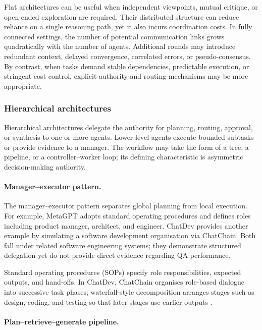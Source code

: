 \documentclass[a4paper,fleqn]{cas-dc}
\begin{document}
Flat architectures can be useful when independent viewpoints, mutual critique, or open-ended exploration are required. Their distributed structure can reduce reliance on a single reasoning path, yet it also incurs coordination costs.
In fully connected settings, the number of potential communication links grows quadratically with the number of agents. Additional rounds may introduce redundant context, delayed convergence, correlated errors, or pseudo-consensus.
By contrast, when tasks demand stable dependencies, predictable execution, or stringent cost control, explicit authority and routing mechanisms may be more appropriate.

\subsubsection{Hierarchical architectures}
\label{sec:hierarchical}

Hierarchical architectures delegate the authority for planning, routing, approval, or synthesis to one or more agents. Lower-level agents execute bounded subtasks or provide evidence to a manager. The workflow may take the form of a tree, a pipeline, or a controller–worker loop; its defining characteristic is asymmetric decision-making authority.

\paragraph{Manager--executor pattern.}
\label{sec:manager_executor}

The manager–executor pattern separates global planning from local execution.
For example, MetaGPT \citep{hong2024metagpt} adopts standard operating procedures and defines roles
including product manager, architect, and engineer. ChatDev \citep{qian2023chatdev}
provides another example by simulating a software development organisation via ChatChain. Both fall under related software engineering systems; they demonstrate structured delegation
yet do not provide direct evidence regarding QA performance. 

Standard operating procedures (SOPs) specify role responsibilities,
expected outputs, and hand-offs. In ChatDev, ChatChain organises role-based
dialogue into successive task phases; waterfall-style decomposition arranges
stages such as design, coding, and testing so that later stages use earlier
outputs \citep{hong2024metagpt,qian2023chatdev}.

\paragraph{Plan--retrieve--generate pipeline.}
\label{sec:pipeline}
\end{document}
